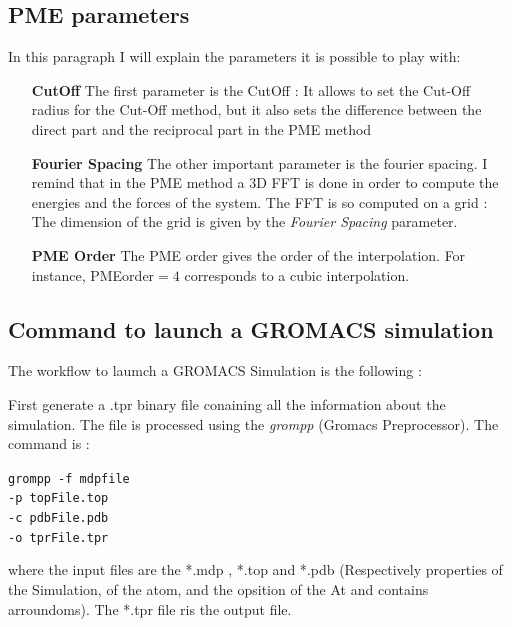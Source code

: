 \documentclass[11pt,twoside,a4paper]{report}
\begin{document}
	\subsection{PME parameters}
	
	In this paragraph I will explain the parameters it is possible to play with:
	
	\begin{enumerate}
	

	\item[\textbf{CutOff}] The first parameter is the CutOff : It allows to set the Cut-Off radius for the Cut-Off method, but it also sets the difference between the direct part and the reciprocal part in the PME method
	
	\item[\textbf{Fourier Spacing}] The other important parameter is the fourier spacing. I remind that in the PME method a 3D FFT is done in order to compute the energies and the forces of the system. The FFT is so computed on a grid : The dimension of the grid is given by the \textit{Fourier Spacing} parameter.
	
	\item[\textbf{PME Order}] The PME order gives the order of the interpolation. For instance, PMEorder$= 4$ corresponds to a cubic interpolation. 		
	
	\end{enumerate}
	
	\subsection{Command to launch a GROMACS simulation }	
	
The workflow to laumch a GROMACS Simulation is the following : 



First generate a .tpr binary file conaining all the information about the simulation. The file is processed using the \textit{grompp} (Gromacs Preprocessor). The command is :


{\centering\tt {grompp -f mdpfile \\
	 -p topFile.top \\
	 -c pdbFile.pdb \\
	 -o tprFile.tpr \\ 
 }}

\vspace{5mm}
where the input files are the *.mdp , *.top and *.pdb (Respectively properties of the Simulation, of the atom, and the opsition of the At and contains arroundoms). The *.tpr file ris the output file.
\end{document}
